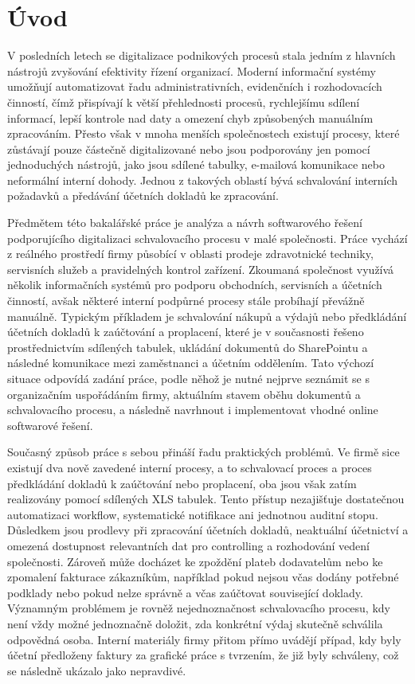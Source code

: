 
\chapter{Úvod}

V posledních letech se digitalizace podnikových procesů stala jedním z hlavních nástrojů zvyšování efektivity řízení organizací. Moderní informační systémy umožňují automatizovat řadu administrativních, evidenčních i rozhodovacích činností, čímž přispívají k větší přehlednosti procesů, rychlejšímu sdílení informací, lepší kontrole nad daty a omezení chyb způsobených manuálním zpracováním. Přesto však v mnoha menších společnostech existují procesy, které zůstávají pouze částečně digitalizované nebo jsou podporovány jen pomocí jednoduchých nástrojů, jako jsou sdílené tabulky, e-mailová komunikace nebo neformální interní dohody. Jednou z takových oblastí bývá schvalování interních požadavků a předávání účetních dokladů ke zpracování.

Předmětem této bakalářské práce je analýza a návrh softwarového řešení podporujícího digitalizaci schvalovacího procesu v malé společnosti. Práce vychází z reálného prostředí firmy působící v oblasti prodeje zdravotnické techniky, servisních služeb a pravidelných kontrol zařízení. Zkoumaná společnost využívá několik informačních systémů pro podporu obchodních, servisních a účetních činností, avšak některé interní podpůrné procesy stále probíhají převážně manuálně. Typickým příkladem je schvalování nákupů a výdajů nebo předkládání účetních dokladů k zaúčtování a proplacení, které je v současnosti řešeno prostřednictvím sdílených tabulek, ukládání dokumentů do SharePointu a následné komunikace mezi zaměstnanci a účetním oddělením. Tato výchozí situace odpovídá zadání práce, podle něhož je nutné nejprve seznámit se s organizačním uspořádáním firmy, aktuálním stavem oběhu dokumentů a schvalovacího procesu, a následně navrhnout i implementovat vhodné online softwarové řešení.

Současný způsob práce s sebou přináší řadu praktických problémů. Ve firmě sice existují dva nově zavedené interní procesy, a to schvalovací proces a proces předkládání dokladů k zaúčtování nebo proplacení, oba jsou však zatím realizovány pomocí sdílených XLS tabulek. Tento přístup nezajišťuje dostatečnou automatizaci workflow, systematické notifikace ani jednotnou auditní stopu. Důsledkem jsou prodlevy při zpracování účetních dokladů, neaktuální účetnictví a omezená dostupnost relevantních dat pro controlling a rozhodování vedení společnosti. Zároveň může docházet ke zpoždění plateb dodavatelům nebo ke zpomalení fakturace zákazníkům, například pokud nejsou včas dodány potřebné podklady nebo pokud nelze správně a včas zaúčtovat související doklady. Významným problémem je rovněž nejednoznačnost schvalovacího procesu, kdy není vždy možné jednoznačně doložit, zda konkrétní výdaj skutečně schválila odpovědná osoba. Interní materiály firmy přitom přímo uvádějí případ, kdy byly účetní předloženy faktury za grafické práce s tvrzením, že již byly schváleny, což se následně ukázalo jako nepravdivé.

